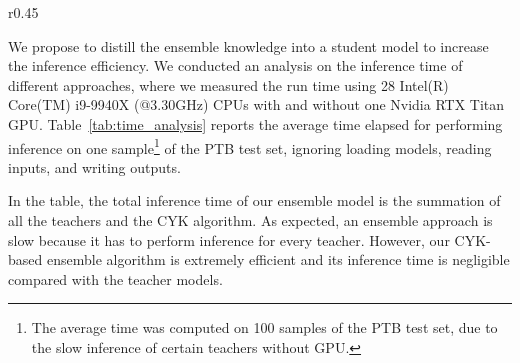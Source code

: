 \documentclass{article}
\begin{document}
\begin{wraptable}{r}{0.45\textwidth}
    \centering
{}
    \caption{Per-sample inference time (in milliseconds) on the PTB test. }
    \label{tab:time_analysis}\vspace{-3pt}
\end{wraptable}

We propose to distill the ensemble knowledge into a student model to increase the inference efficiency. We conducted an analysis on the inference time of different approaches, where we measured the run time using 28 Intel(R) Core(TM) i9-9940X (@3.30GHz) CPUs with and without one Nvidia RTX Titan GPU. Table~\ref{tab:time_analysis} reports the average time elapsed for performing inference on one sample\footnote{The average time was computed on 100 samples of the PTB test set, due to the slow inference of certain teachers without GPU.} of the PTB test set, ignoring loading models, reading inputs, and writing outputs. 

In the table, the total inference time of our ensemble model is the summation of all the teachers and the CYK algorithm. As expected, an ensemble approach is slow because it has to perform inference for every teacher. However, our CYK-based ensemble algorithm is extremely efficient and its inference time is negligible compared with the teacher models.
\end{document}
